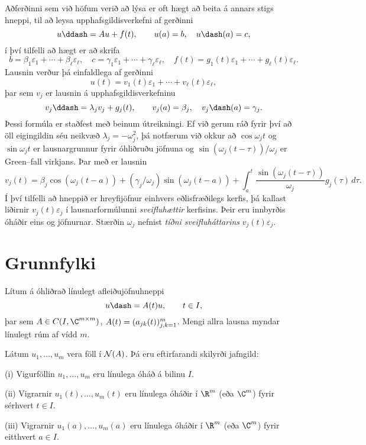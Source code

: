 Aðferðinni sem við höfum verið að lýsa er oft hægt að beita á annars
stigs hneppi, til að leysa upphafsgildisverkefni af gerðinni
 \begin{equation*}u\ddash=Au+f(t), \qquad u(a)=b, \quad u\dash(a)=c,
\label{5.2.4}
 \end{equation*}
í því tilfelli að hægt er að skrifa 
 $$b=\beta_1\varepsilon_1+\cdots+\beta_\ell\varepsilon_\ell, \quad
c=\gamma_1\varepsilon_1+\cdots+\gamma_\ell\varepsilon_\ell,\quad
f(t)=g_1(t)\varepsilon_1+\cdots+g_\ell(t)\varepsilon_\ell.
 $$
Lausnin verður þá einfaldlega af gerðinni
 \begin{equation*}u(t)=v_1(t)\varepsilon_1+\cdots+v_\ell(t)\varepsilon_\ell,
\label{5.2.5}
 \end{equation*}
þar sem $v_j$ er lausnin á upphafsgildisverkefninu
 \begin{equation*}v_j\ddash=\lambda_j v_j +g_j(t), \qquad v_j(a)=\beta_j, \quad
v_j\dash(a)=\gamma_j. 
\label{5.2.6}
 \end{equation*}
Þessi formúla er staðfest með beinum útreikningi.
Ef við gerum ráð fyrir því að öll eigingildin séu neikvæð
$\lambda_j=-\omega_j^2$, þá notfærum við okkur að
$\cos {\omega}_j t$ og $\sin {\omega}_jt$ er lausnargrunnur fyrir 
óhliðruðu jöfnuna og $\sin({\omega}_j(t-{\tau}))/{\omega}_j$ er
Green--fall virkjans.  Þar með er lausnin
 \begin{equation*}v_j(t)=\beta_j \cos(\omega_j(t-a))+
(\gamma_j/\omega_j)\sin (\omega_j(t-a)) +
\int_a^t\dfrac{\sin (\omega_j(t-\tau))}{\omega_j}g_j(\tau) \, d\tau. 
\label{5.2.7}
 \end{equation*}
Í því tilfelli að hneppið er hreyfijöfnur einhvers
eðlisfræðilegs kerfis, þá kallast liðirnir $v_j(t)\varepsilon_j$ í
lausnarformúlunni  {\it sveifluhættir} kerfisins.  Þeir eru
innbyrðis óháðir eins og jöfnurnar.  Stærðin 
${\omega}_j$ nefnist {\it tíðni
sveifluháttarins} $v_j(t)\varepsilon_j$.

 
\section{Grunnfylki}

\noindent
Lítum á óhliðrað línulegt afleiðujöfnuhneppi 
 $$u\dash=A(t)u, \qquad t\in I,
 $$
þar sem  $A\in C(I,\C\sp{m\times m})$, 
$A(t)=(a_{jk}(t))_{j,k=1}\sp m$.
Mengi allra lausna myndar línulegt rúm af vídd $m$.




\begin{hs}\label{hs5.3.1} Látum $u_1,\dots,u_m$ vera föll í ${\cal N}(A)$.  Þá eru
eftirfarandi skilyrði jafngild:

\noindent
(i) Vigurföllin $u_1,\dots,u_m$ eru línulega óháð á bilinu $I$.

\noindent
(ii) Vigrarnir $u_1(t),\dots,u_m(t)$ eru línulega óháðir í $\R\sp m$
(eða $\C\sp m$) fyrir sérhvert $t\in I$.

\noindent
(iii) Vigrarnir $u_1(a),\dots,u_m(a)$ eru línulega óháðir í $\R\sp m$
(eða $\C\sp m$) fyrir eitthvert  $a\in I$.
 \end{hs}


